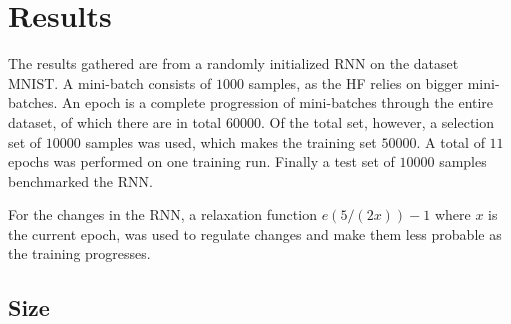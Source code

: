 \chapter{Results}

The results gathered are from a randomly initialized RNN on the dataset MNIST. A mini-batch consists of $1000$ samples, as the HF relies on bigger mini-batches. An epoch is a complete progression of mini-batches through the entire dataset, of which there are in total $60 000$. Of the total set, however, a selection set of $10 000$ samples was used, which makes the training set $50000$. A total of $11$ epochs was performed on one training run. Finally a test set of $10000$ samples benchmarked the RNN.

For the changes in the RNN, a relaxation function $e(5/(2x)) - 1$ where $x$ is the current epoch, was used to regulate changes and make them less probable as the training progresses.

\section{Size}

\section{}